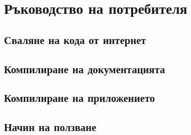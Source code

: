 \chapter{Ръководство на потребителя}
  \section{Сваляне на кода от интернет}
  \section{Компилиране на документацията}
  \section{Компилиране на приложението}
  \section{Начин на ползване}
